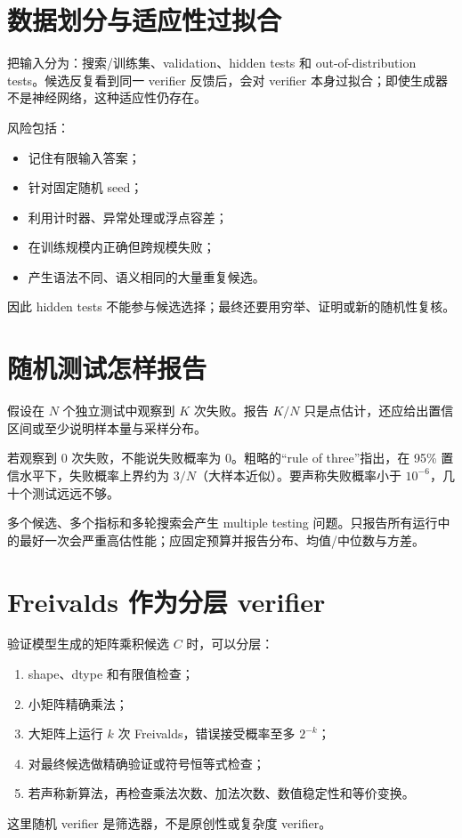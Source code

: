 \section{数据划分与适应性过拟合}

把输入分为：搜索/训练集、validation、hidden tests 和 out-of-distribution tests。候选反复看到同一 verifier 反馈后，会对 verifier 本身过拟合；即使生成器不是神经网络，这种适应性仍存在。

风险包括：
\begin{itemize}
  \item 记住有限输入答案；
  \item 针对固定随机 seed；
  \item 利用计时器、异常处理或浮点容差；
  \item 在训练规模内正确但跨规模失败；
  \item 产生语法不同、语义相同的大量重复候选。
\end{itemize}
因此 hidden tests 不能参与候选选择；最终还要用穷举、证明或新的随机性复核。

\section{随机测试怎样报告}

假设在 $N$ 个独立测试中观察到 $K$ 次失败。报告 $K/N$ 只是点估计，还应给出置信区间或至少说明样本量与采样分布。

若观察到 0 次失败，不能说失败概率为 0。粗略的“rule of three”指出，在 95\% 置信水平下，失败概率上界约为 $3/N$（大样本近似）。要声称失败概率小于 $10^{-6}$，几十个测试远远不够。

多个候选、多个指标和多轮搜索会产生 multiple testing 问题。只报告所有运行中的最好一次会严重高估性能；应固定预算并报告分布、均值/中位数与方差。

\section{Freivalds 作为分层 verifier}

验证模型生成的矩阵乘积候选 $C$ 时，可以分层：
\begin{enumerate}
  \item shape、dtype 和有限值检查；
  \item 小矩阵精确乘法；
  \item 大矩阵上运行 $k$ 次 Freivalds，错误接受概率至多 $2^{-k}$；
  \item 对最终候选做精确验证或符号恒等式检查；
  \item 若声称新算法，再检查乘法次数、加法次数、数值稳定性和等价变换。
\end{enumerate}
这里随机 verifier 是筛选器，不是原创性或复杂度 verifier。

